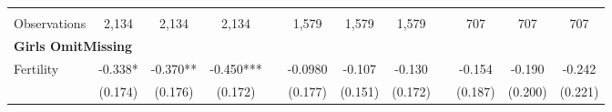 \begin{landscape}
\begin{table}[htpb!]
\begin{center}
\begin{tabular}{lcccp{2mm}cccp{2mm}ccc}
\begin{footnotesize}\end{footnotesize}&\begin{footnotesize}\end{footnotesize}&\begin{footnotesize}\end{footnotesize}&\begin{footnotesize}\end{footnotesize}&\begin{footnotesize}\end{footnotesize}&\begin{footnotesize}\end{footnotesize}&\begin{footnotesize}\end{footnotesize}&\begin{footnotesize}\end{footnotesize}&\begin{footnotesize}\end{footnotesize}&\begin{footnotesize}\end{footnotesize}&\begin{footnotesize}\end{footnotesize}&\begin{footnotesize}\end{footnotesize}\\Observations&2,134&2,134&2,134&&1,579&1,579&1,579&&707&707&707\\
\multicolumn{12}{l}{\textbf{Girls OmitMissing}}\\ 
Fertility&-0.338*&-0.370**&-0.450***&&-0.0980&-0.107&-0.130&&-0.154&-0.190&-0.242\\
&(0.174)&(0.176)&(0.172)&&(0.177)&(0.151)&(0.172)&&(0.187)&(0.200)&(0.221)\\

\end{tabular}
\end{center}
\end{table}
\end{landscape}
